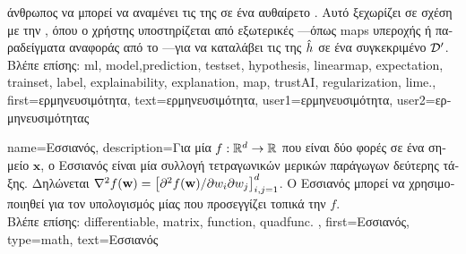 {{{		άνθρωπος να μπορεί να αναμένει τις}  \foreignlanguage{greek}{της σε ένα αυθαίρετο} 
	 	. \foreignlanguage{greek}{Αυτό ξεχωρίζει σε σχέση με την} , 
		\foreignlanguage{greek}{όπου ο χρήστης υποστηρίζεται από εξωτερικές} —\foreignlanguage{greek}{όπως}  
		\gls{map}s \foreignlanguage{greek}{υπεροχής ή παραδείγματα αναφοράς από το} —\foreignlanguage{greek}{για 
		να καταλάβει τις}  \foreignlanguage{greek}{της $\hat{h}$ σε ένα συγκεκριμένο} 
		 $\mathcal{D}'$. \\ 
	 	\foreignlanguage{greek}{Βλέπε επίσης:} \gls{ml}, \gls{model},\gls{prediction}, \gls{testset}, \gls{hypothesis}, \gls{linearmap}, \gls{expectation}, 
		\gls{trainset}, \gls{label}, \gls{explainability}, \gls{explanation}, \gls{map}, \gls{trustAI}, \gls{regularization}, \gls{lime}.},
	first={\foreignlanguage{greek}{ερμηνευσιμότητα}},
	text={\foreignlanguage{greek}{ερμηνευσιμότητα}},
	user1={\foreignlanguage{greek}{ερμηνευσιμότητα}}, %
	user2={\foreignlanguage{greek}{ερμηνευσιμότητας}} %
}

{name={\foreignlanguage{greek}{Εσσιανός}},
 	description={\foreignlanguage{greek}{Για μία}  $f: \mathbb{R}^{d} \to \mathbb{R}$ 
 		\foreignlanguage{greek}{που είναι δύο φορές}  \foreignlanguage{greek}{σε ένα σημείο $\mathbf{x}$, ο Εσσιανός 
		είναι μία συλλογή τετραγωνικών}  \foreignlanguage{greek}{μερικών παράγωγων δεύτερης τάξης. 
 		Δηλώνεται $\nabla^2 f({\bf w}) = \left[ {\partial^2 f({\bf w})}/{\partial w_i \partial w_j} \right]_{i,j=1}^{d}$. 
        		Ο Εσσιανός μπορεί να χρησιμοποιηθεί για τον υπολογισμός μίας}  \foreignlanguage{greek}{που 
		προσεγγίζει τοπικά την} $f$. \\
		\foreignlanguage{greek}{Βλέπε επίσης:} \gls{differentiable}, \gls{matrix}, \gls{function}, \gls{quadfunc}. }, 
	first={\foreignlanguage{greek}{Εσσιανός}},
	type=math,
	text={\foreignlanguage{greek}{Εσσιανός}}
}

